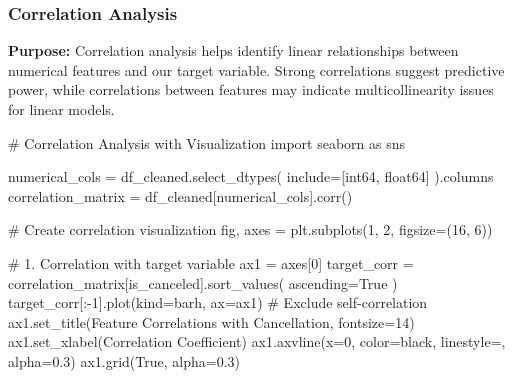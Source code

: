 \documentclass[
  letterpaper,
  DIV=11,
  numbers=noendperiod]{scrartcl}
\newenvironment{Shaded}{\begin{snugshade}}{\end{snugshade}}
\newcommand{\CommentTok}[1]{\textcolor[rgb]{0.37,0.37,0.37}{#1}}
\newcommand{\DecValTok}[1]{\textcolor[rgb]{0.68,0.00,0.00}{#1}}
\newcommand{\FloatTok}[1]{\textcolor[rgb]{0.68,0.00,0.00}{#1}}
\newcommand{\ImportTok}[1]{\textcolor[rgb]{0.00,0.46,0.62}{#1}}
\newcommand{\NormalTok}[1]{\textcolor[rgb]{0.00,0.23,0.31}{#1}}
\newcommand{\OperatorTok}[1]{\textcolor[rgb]{0.37,0.37,0.37}{#1}}
\newcommand{\StringTok}[1]{\textcolor[rgb]{0.13,0.47,0.30}{#1}}
\newcommand{\VariableTok}[1]{\textcolor[rgb]{0.07,0.07,0.07}{#1}}
\renewenvironment{Shaded}{%
  \begin{tcolorbox}[%
    enhanced,%
    colback=codebg,%
    colframe=codebg,%
    borderline west={3pt}{0pt}{sectionblue},%
    fontupper=\small\ttfamily,%
    boxrule=0pt,%
    arc=0pt,%
    boxsep=5pt,%
    left=2mm,%
    right=2mm,%
    top=2mm,%
    bottom=2mm%
  ]%
}{%
  \end{tcolorbox}%
}
\begin{document}
\subsubsection{Correlation Analysis}\label{correlation-analysis}

\textbf{Purpose:} Correlation analysis helps identify linear
relationships between numerical features and our target variable. Strong
correlations suggest predictive power, while correlations between
features may indicate multicollinearity issues for linear models.

\begin{Shaded}
\begin{Highlighting}[]
\CommentTok{\# Correlation Analysis with Visualization}
\ImportTok{import}\NormalTok{ seaborn }\ImportTok{as}\NormalTok{ sns}

\NormalTok{numerical\_cols }\OperatorTok{=}\NormalTok{ df\_cleaned.select\_dtypes(}
\NormalTok{    include}\OperatorTok{=}\NormalTok{[}\StringTok{\textquotesingle{}int64\textquotesingle{}}\NormalTok{, }\StringTok{\textquotesingle{}float64\textquotesingle{}}\NormalTok{]}
\NormalTok{).columns}
\NormalTok{correlation\_matrix }\OperatorTok{=}\NormalTok{ df\_cleaned[numerical\_cols].corr()}

\CommentTok{\# Create correlation visualization}
\NormalTok{fig, axes }\OperatorTok{=}\NormalTok{ plt.subplots(}\DecValTok{1}\NormalTok{, }\DecValTok{2}\NormalTok{, figsize}\OperatorTok{=}\NormalTok{(}\DecValTok{16}\NormalTok{, }\DecValTok{6}\NormalTok{))}

\CommentTok{\# 1. Correlation with target variable}
\NormalTok{ax1 }\OperatorTok{=}\NormalTok{ axes[}\DecValTok{0}\NormalTok{]}
\NormalTok{target\_corr }\OperatorTok{=}\NormalTok{ correlation\_matrix[}\StringTok{\textquotesingle{}is\_canceled\textquotesingle{}}\NormalTok{].sort\_values(}
\NormalTok{    ascending}\OperatorTok{=}\VariableTok{True}
\NormalTok{)}
\NormalTok{target\_corr[:}\OperatorTok{{-}}\DecValTok{1}\NormalTok{].plot(kind}\OperatorTok{=}\StringTok{\textquotesingle{}barh\textquotesingle{}}\NormalTok{, ax}\OperatorTok{=}\NormalTok{ax1)  }\CommentTok{\# Exclude self{-}correlation}
\NormalTok{ax1.set\_title(}\StringTok{\textquotesingle{}Feature Correlations with Cancellation\textquotesingle{}}\NormalTok{, fontsize}\OperatorTok{=}\DecValTok{14}\NormalTok{)}
\NormalTok{ax1.set\_xlabel(}\StringTok{\textquotesingle{}Correlation Coefficient\textquotesingle{}}\NormalTok{)}
\NormalTok{ax1.axvline(x}\OperatorTok{=}\DecValTok{0}\NormalTok{, color}\OperatorTok{=}\StringTok{\textquotesingle{}black\textquotesingle{}}\NormalTok{, linestyle}\OperatorTok{=}\StringTok{\textquotesingle{}{-}\textquotesingle{}}\NormalTok{, alpha}\OperatorTok{=}\FloatTok{0.3}\NormalTok{)}
\NormalTok{ax1.grid(}\VariableTok{True}\NormalTok{, alpha}\OperatorTok{=}\FloatTok{0.3}\NormalTok{)}


\end{Highlighting}
\end{Shaded}
\end{document}
